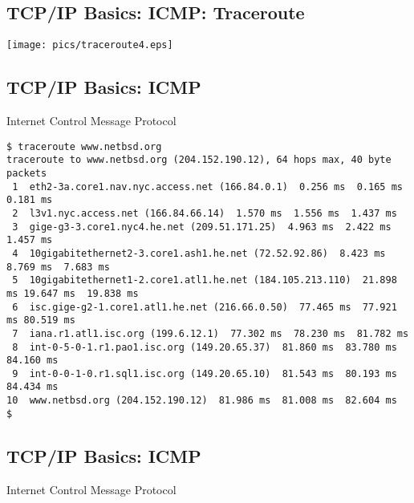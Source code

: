 \documentclass[xga]{xdvislides}
\begin{document}
\subsection{TCP/IP Basics: ICMP: Traceroute}
\vspace*{\fill}
\begin{center}
	\texttt{[image: pics/traceroute4.eps]}
\end{center}
\vspace*{\fill}



\subsection{TCP/IP Basics: ICMP}
\begin{center}
Internet Control Message Protocol
\end{center}
\vspace{.2in}

\begin{verbatim}
$ traceroute www.netbsd.org
traceroute to www.netbsd.org (204.152.190.12), 64 hops max, 40 byte packets
 1  eth2-3a.core1.nav.nyc.access.net (166.84.0.1)  0.256 ms  0.165 ms 0.181 ms
 2  l3v1.nyc.access.net (166.84.66.14)  1.570 ms  1.556 ms  1.437 ms
 3  gige-g3-3.core1.nyc4.he.net (209.51.171.25)  4.963 ms  2.422 ms  1.457 ms
 4  10gigabitethernet2-3.core1.ash1.he.net (72.52.92.86)  8.423 ms  8.769 ms  7.683 ms
 5  10gigabitethernet1-2.core1.atl1.he.net (184.105.213.110)  21.898 ms 19.647 ms  19.838 ms
 6  isc.gige-g2-1.core1.atl1.he.net (216.66.0.50)  77.465 ms  77.921 ms 80.519 ms
 7  iana.r1.atl1.isc.org (199.6.12.1)  77.302 ms  78.230 ms  81.782 ms
 8  int-0-5-0-1.r1.pao1.isc.org (149.20.65.37)  81.860 ms  83.780 ms 84.160 ms
 9  int-0-0-1-0.r1.sql1.isc.org (149.20.65.10)  81.543 ms  80.193 ms 84.434 ms
10  www.netbsd.org (204.152.190.12)  81.986 ms  81.008 ms  82.604 ms
$
\end{verbatim}

\subsection{TCP/IP Basics: ICMP}
\begin{center}
Internet Control Message Protocol
\end{center}
\end{document}
